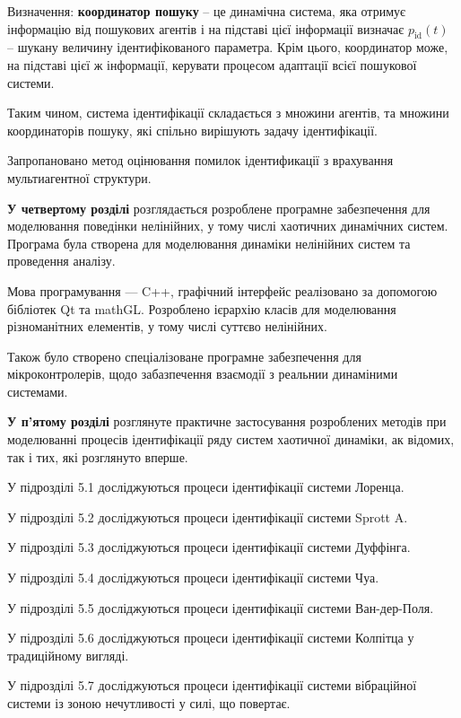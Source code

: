 \documentclass[a4paper,12pt]{atuaref}
\begin{document}
Визначення:
\textbf{координатор пошуку} -- це динамічна система, яка отримує інформацію
від пошукових агентів і на підставі цієї інформації визначає
$p_{\mathrm{id}}(t)$ -- шукану величину ідентифікованого параметра.
Крім цього, координатор може, на підставі цієї ж інформації,
керувати процесом адаптації всієї пошукової системи.

Таким чином, система ідентифікації складається з множини агентів, та
множини координаторів пошуку, які спільно вирішують задачу ідентифікації.


Запропановано метод оцінювання помилок ідентификації
з врахування мультиагентної структури.





\textbf{У четвертому розділі} розглядається розроблене програмне
забезпечення
для моделювання
поведінки  нелінійних,
у тому числі хаотичних динамічних систем.
Програма була створена для моделювання динаміки
нелінійних систем та проведення аналізу.

Мова програмування --- C++,
графічний інтерфейс реалізовано за допомогою
бібліотек Qt та mathGL.
Розроблено ієрархію класів для
моделювання різноманітних елементів,
у тому числі суттєво нелінійних.

Також було створено спеціалізоване
програмне забезпечення для мікроконтролерів,
щодо забазпечення взаємодії
з реальнии динаміними системами.




\textbf{У п'ятому розділі}
розглянуте практичне застосування розроблених методів при моделюванні
процесів ідентифікації ряду систем хаотичної динаміки,
ак відомих, так і тих, які розглянуто вперше.

У підрозділі 5.1 досліджуються процеси ідентифікації системи Лоренца.

У підрозділі 5.2 досліджуються процеси ідентифікації системи Sprott A.

У підрозділі 5.3 досліджуються процеси ідентифікації системи Дуффінга.

У підрозділі 5.4 досліджуються процеси ідентифікації системи Чуа.

У підрозділі 5.5 досліджуються процеси ідентифікації системи Ван-дер-Поля.

У підрозділі 5.6 досліджуються процеси ідентифікації системи Колпітца у традиційному вигляді.

У підрозділі 5.7 досліджуються процеси ідентифікації системи вібраційної системи
із зоною нечутливості у силі, що повертає.
\end{document}
